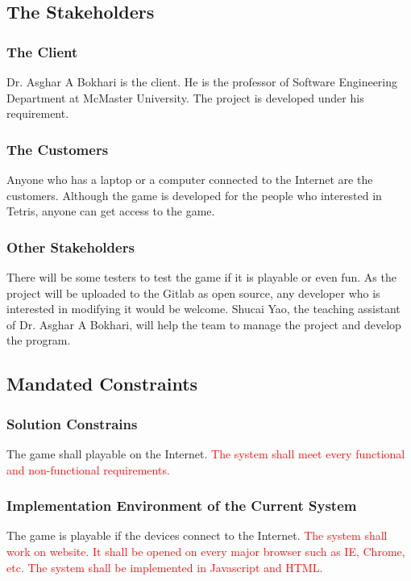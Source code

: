 \documentclass[12pt, titlepage]{article}
\begin{document}
\subsection{The Stakeholders}

\subsubsection{The Client}
\tab  Dr. Asghar A Bokhari is the client. He is the professor of Software Engineering Department at McMaster University. The project is developed under his requirement.

\subsubsection{The Customers}
\tab Anyone who has a laptop or a computer connected to the Internet are the customers. Although the game is developed for the people who interested in Tetris, anyone can get access to the game.

\subsubsection{Other Stakeholders}
\tab There will be some testers to test the game if it is playable or even fun.  As the project will be uploaded to the Gitlab as open source, any developer who is interested in modifying it would be welcome. Shucai Yao, the teaching assistant of Dr. Asghar A Bokhari, will help the team to manage the project and develop the program.
   

\subsection{Mandated Constraints}

\subsubsection{Solution Constrains}
\tab  The game shall playable on the Internet.
\tab \textcolor{red}{The system shall meet every functional and non-functional requirements.}

\subsubsection{Implementation Environment of the Current System}
\tab The game is playable if the devices connect to the Internet.
\textcolor{red}{The system shall work on website. It shall be opened on
every major browser such as IE, Chrome, etc. 
The system shall be implemented in Javascript and HTML.}
\end{document}
